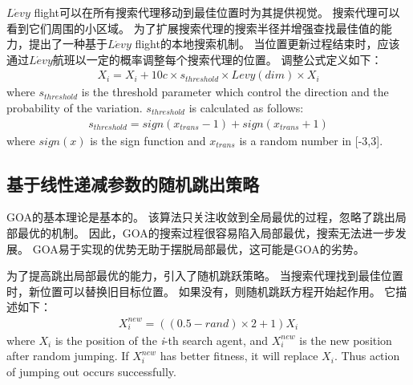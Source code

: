 $ L\acute{e}vy $ flight可以在所有搜索代理移动到最佳位置时为其提供视觉。 搜索代理可以看到它们周围的小区域。 为了扩展搜索代理的搜索半径并增强查找最佳值的能力，提出了一种基于$ L\acute{e}vy $ flight的本地搜索机制。 当位置更新过程结束时，应该通过$ L\acute{e}vy $航班以一定的概率调整每个搜索代理的位置。 调整公式定义如下：
\begin{eqnarray}
	X_i=X_i+10c\times s_{threshold}\times Levy(dim)\times X_i
\end{eqnarray}
where $s_{threshold}$ is the threshold parameter which control the direction and the probability of the variation. $s_{threshold}$ is calculated as follows:
\begin{eqnarray}
	s_{threshold}=sign(x_{trans}-1)+sign(x_{trans}+1)
\end{eqnarray}
where $sign(x)$ is the sign function and $x_{trans}$ is a random number in [-3,3].
\subsection{基于线性递减参数的随机跳出策略}
GOA的基本理论是基本的。 该算法只关注收敛到全局最优的过程，忽略了跳出局部最优的机制。 因此，GOA的搜索过程很容易陷入局部最优，搜索无法进一步发展。 GOA易于实现的优势无助于摆脱局部最优，这可能是GOA的劣势。

为了提高跳出局部最优的能力，引入了随机跳跃策略。 当搜索代理找到最佳位置时，新位置可以替换旧目标位置。 如果没有，则随机跳跃方程开始起作用。 它描述如下：
\begin{eqnarray}
	X_i^{new}=((0.5-rand)\times 2+1)X_i 
\end{eqnarray}
where $X_i$ is the position of the \emph{i}-th search agent, and $X_i^{new}$ is the new position after random jumping. If $X_i^{new}$ has better fitness, it will replace $X_i$. Thus action of jumping out occurs successfully. 

